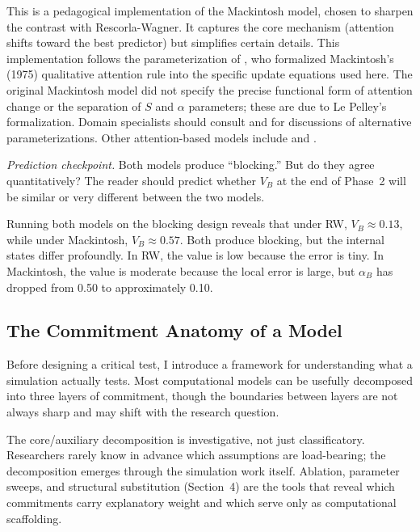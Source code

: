 \documentclass[fleqn,10pt]{wlscirep}
\begin{document}
\begin{linenumbers}
This is a pedagogical implementation of the Mackintosh model, chosen to sharpen the contrast with Rescorla-Wagner. It captures the core mechanism (attention shifts toward the best predictor) but simplifies certain details. This implementation follows the parameterization of \citet{lepelley2004role}, who formalized Mackintosh's (1975) qualitative attention rule into the specific update equations used here. The original Mackintosh model did not specify the precise functional form of attention change or the separation of $S$ and $\alpha$ parameters; these are due to Le Pelley's formalization. Domain specialists should consult \citet{lepelley2004role} and \citet{wills2020progress} for discussions of alternative parameterizations. Other attention-based models include \citet{pearce1980model} and \citet{kruschke2001toward}.

\emph{Prediction checkpoint.} Both models produce ``blocking.'' But do they agree quantitatively? The reader should predict whether $V_B$ at the end of Phase~2 will be similar or very different between the two models.

Running both models on the blocking design reveals that under RW, $V_B \approx 0.13$, while under Mackintosh, $V_B \approx 0.57$. Both produce blocking, but the internal states differ profoundly. In RW, the value is low because the error is tiny. In Mackintosh, the value is moderate because the local error is large, but $\alpha_B$ has dropped from 0.50 to approximately 0.10.

\subsection{The Commitment Anatomy of a Model}

Before designing a critical test, I introduce a framework for understanding what a simulation actually tests. Most computational models can be usefully decomposed into three layers of commitment, though the boundaries between layers are not always sharp and may shift with the research question.

The core/auxiliary decomposition is investigative, not just classificatory. Researchers rarely know in advance which assumptions are load-bearing; the decomposition emerges through the simulation work itself. Ablation, parameter sweeps, and structural substitution (Section~4) are the tools that reveal which commitments carry explanatory weight and which serve only as computational scaffolding.


\end{linenumbers}
\end{document}
